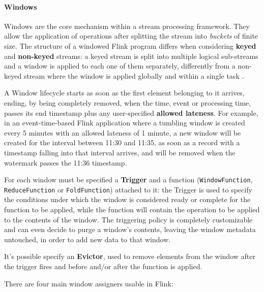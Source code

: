 \paragraph{Windows}

Windows are the core mechanism within a stream processing framework. They allow the application of operations after splitting the stream into \textit{buckets} of finite size. The structure of a windowed Flink program differs when considering \textbf{keyed} and \textbf{non-keyed} streams: a keyed stream is split into multiple logical sub-streams and a window is applied to each one of them separately, differently from a non-keyed stream where the window is applied globally and within a single task \cite{flink_windows}.

A Window lifecycle starts as soon as the first element belonging to it arrives, ending, by being completely removed, when the time, event or processing time, passes its end timestamp plus any user-specified \textbf{allowed lateness}. For example, in an event-time-based Flink application where a tumbling window is created every 5 minutes with an allowed lateness of 1 minute, a new window will be created for the interval between 11:30 and 11:35, as soon as a record with a timestamp falling into that interval arrives, and will be removed when the watermark passes the 11:36 timestamp.

For each window must be specified a \textbf{Trigger} and a function (\texttt{WindowFunction}, \texttt{ReduceFunction} or \texttt{FoldFunction}) attached to it: the Trigger is used to specify the conditions under which the window is considered ready or complete for the function to be applied, while the function will contain the operation to be applied to the contents of the window. The triggering policy is completely customizable and can even decide to purge a window’s contents, leaving the window metadata untouched, in order to add new data to that window.

It's possible specify an \textbf{Evictor}, used to remove elements from the window after the trigger fires and before and/or after the function is applied.

There are four main window assigners usable in Flink:

